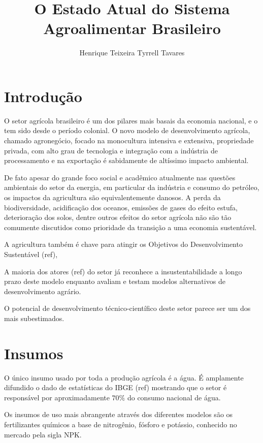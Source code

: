 \documentclass[]{article}
\title{O Estado Atual do Sistema Agroalimentar Brasileiro}
\author{Henrique Teixeira Tyrrell Tavares}
\begin{document}
\maketitle

\begin{abstract}

\end{abstract}

\section{Introdução}

O setor agrícola brasileiro é um dos pilares mais basais da economia nacional, e o tem sido desde o período colonial. O novo modelo de desenvolvimento agrícola, chamado agronegócio, focado na monocultura intensiva e extensiva, propriedade privada, com alto grau de tecnologia  e integração com a indústria de processamento e na exportação é sabidamente de altíssimo impacto ambiental.

De fato apesar do grande foco social e acadêmico atualmente nas questões ambientais do setor da energia, em particular da indústria e consumo do petróleo, os impactos da agricultura são equivalentemente danosos. A perda da biodiversidade, acidificação dos oceanos, emissões de gases do efeito estufa, deterioração dos solos, dentre outros efeitos do setor agrícola não são tão comumente discutidos como prioridade da transição a uma economia sustentável. 

A agricultura também é chave para atingir os Objetivos do Desenvolvimento Sustentável (ref), 

A maioria dos atores (ref) do setor já reconhece a insustentabilidade a longo prazo deste modelo enquanto avaliam e testam modelos alternativos de desenvolvimento agrário. 

O potencial de desenvolvimento técnico-científico deste setor parece ser um dos mais subestimados.



\section{Insumos}

O único insumo usado por toda a produção agrícola é a água. É amplamente difundido o dado de estatísticas do IBGE (ref) mostrando que o setor é responsável por aproximadamente $70\%$ do consumo nacional de água. 

Os insumos de uso mais abrangente através dos diferentes modelos são os fertilizantes químicos a base de nitrogênio, fósforo e potássio, conhecido no mercado pela sigla NPK. 
\end{document}
